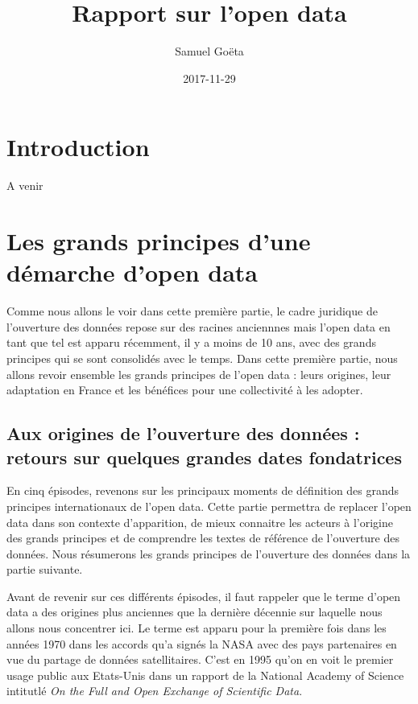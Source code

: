 \documentclass[]{book}
\title{Rapport sur l'open data}
\author{Samuel Goëta}
\date{2017-11-29}
\theoremstyle{definition}
\theoremstyle{definition}
\theoremstyle{definition}
\theoremstyle{remark}
\begin{document}
\maketitle

{
\setcounter{tocdepth}{1}
\tableofcontents
}
\chapter*{Introduction}\label{introduction}

A venir

\chapter{Les grands principes d'une démarche d'open
data}\label{les-grands-principes-dune-demarche-dopen-data}

Comme nous allons le voir dans cette première partie, le cadre juridique
de l'ouverture des données repose sur des racines anciennnes mais l'open
data en tant que tel est apparu récemment, il y a moins de 10 ans, avec
des grands principes qui se sont consolidés avec le temps. Dans cette
première partie, nous allons revoir ensemble les grands principes de
l'open data : leurs origines, leur adaptation en France et les bénéfices
pour une collectivité à les adopter.

\section{Aux origines de l'ouverture des données : retours sur quelques
grandes dates
fondatrices}\label{aux-origines-de-louverture-des-donnees-retours-sur-quelques-grandes-dates-fondatrices}

En cinq épisodes, revenons sur les principaux moments de définition des
grands principes internationaux de l'open data. Cette partie permettra
de replacer l'open data dans son contexte d'apparition, de mieux
connaitre les acteurs à l'origine des grands principes et de comprendre
les textes de référence de l'ouverture des données. Nous résumerons les
grands principes de l'ouverture des données dans la partie suivante.

Avant de revenir sur ces différents épisodes, il faut rappeler que le
terme d'open data a des origines plus anciennes que la dernière décennie
sur laquelle nous allons nous concentrer ici. Le terme est apparu pour
la première fois dans les années 1970 dans les accords qu'a signés la
NASA avec des pays partenaires en vue du partage de données
satellitaires. C'est en 1995 qu'on en voit le premier usage public aux
Etats-Unis dans un rapport de la National Academy of Science intitutlé
\emph{On the Full and Open Exchange of Scientific Data}.
\end{document}
